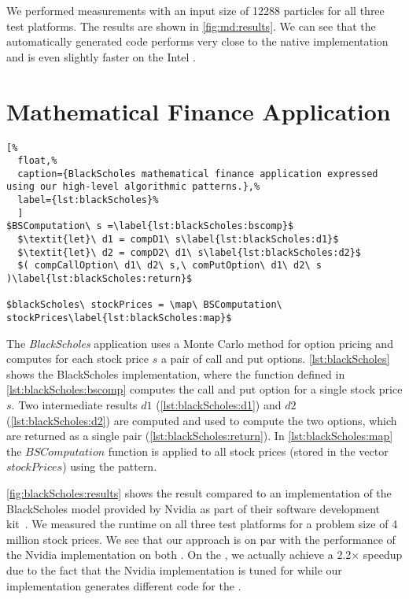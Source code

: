 We performed measurements with an input size of 12288 particles for all three test platforms.
The results are shown in \autoref{fig:md:results}.
We can see that the automatically generated \OpenCL code performs very close to the native \OpenCL implementation and is even slightly faster on the Intel \CPU.



\section{Mathematical Finance Application}

\begin{lstlisting}[%
  float,%
  caption={BlackScholes mathematical finance application expressed using our high-level algorithmic patterns.},%
  label={lst:blackScholes}%
  ]
$BSComputation\ s =\label{lst:blackScholes:bscomp}$
  $\textit{let}\ d1 = compD1\ s\label{lst:blackScholes:d1}$
  $\textit{let}\ d2 = compD2\ d1\ s\label{lst:blackScholes:d2}$
  $( compCallOption\ d1\ d2\ s,\ comPutOption\ d1\ d2\ s )\label{lst:blackScholes:return}$

$blackScholes\ stockPrices = \map\ BSComputation\ stockPrices\label{lst:blackScholes:map}$
\end{lstlisting}

The \emph{BlackScholes} application uses a Monte Carlo method for option pricing and computes for each stock price $s$ a pair of call and put options.
\autoref{lst:blackScholes} shows the BlackScholes implementation, where the function defined in \autoref{lst:blackScholes:bscomp} computes the call and put option for a single stock price $s$.
Two intermediate results $d1$ (\autoref{lst:blackScholes:d1}) and $d2$ (\autoref{lst:blackScholes:d2}) are computed and used to compute the two options, which are returned as a single pair (\autoref{lst:blackScholes:return}).
In \autoref{lst:blackScholes:map} the $BSComputation$ function is applied to all stock prices (stored in the vector $stockPrices$) using the \map pattern.


\autoref{fig:blackScholes:results} shows the result compared to an \OpenCL implementation of the BlackScholes model provided by Nvidia as part of their software development kit~\cite{NvidiaSDK}.
We measured the runtime on all three test platforms for a problem size of 4 million stock prices.
We see that our approach is on par with the performance of the Nvidia implementation on both \GPUs.
On the \CPU, we actually achieve a 2.2$\times$ speedup due to the fact that the Nvidia implementation is tuned for \GPUs while our implementation generates different code for the \CPU.







